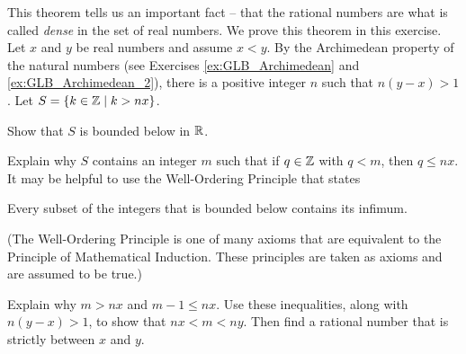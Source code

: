 This theorem tells us an important fact -- that the rational numbers are what is called \emph{dense} in the set of real numbers. We prove this theorem in this exercise. Let $x$ and $y$ be real numbers and assume $x < y$. By the Archimedean property of the natural numbers (see Exercises \ref{ex:GLB_Archimedean} and \ref{ex:GLB_Archimedean_2}), there is a positive integer $n$ such that $n(y-x) > 1$. Let $S = \{k \in \mathbb{Z} \mid k > nx \}$. 
\ba
\item Show that $S$ is bounded below in $\mathbb{R}$.

\item Explain why $S$ contains an integer $m$ such that if $q \in \mathbb{Z}$ with $q < m$, then $q \leq nx$.  It may be helpful to use the Well-Ordering Principle that states
\begin{center} Every subset of the integers that is bounded below contains its infimum. \end{center}
(The Well-Ordering Principle is one of many axioms that are equivalent to the Principle of Mathematical Induction. These principles are taken as axioms and are assumed to be true.)

\item Explain why $m > nx$ and $m-1 \leq nx$. Use these inequalities, along with $n(y-x) > 1$, to show that $nx < m < ny$. Then find a rational number that is strictly between $x$ and $y$.  

\ea


\begin{comment}

\ExerciseSolution

\ba
\item The real number $nx$ is a lower bound for $S$ in $\R$. That is, if $q \in \Z$ with $q < nx$, then $q \notin S$. 

\item We now know that $S$ is bounded below. To show that $S$ has an infimum, we need to show that $S$ is not empty. This is again by the Archimedean property of $\Z$ -- that $\Z$ is unbounded above. Since $S$ is a nonempty set that is bounded below, $S$ has an infimum $m$. The Well-Ordering Principle then shows that $m \in S$. 

\item Since $m \in S$, we have $m > nx$ by definition. The fact that $m-1 < m$ and that $m$ is the greatest lower bound of $S$ implies that $m-1 \notin S$. So $m-1 \leq nx$ and $m \leq nx + 1$. 
Recall that $n(y-x) > 1$, so $ny > nx+1$ and we have 
\[m \leq nx +1 < ny.\]
Combining the inequalities $nx < m$ and $m < ny$ gives us 
\[nx<m < ny.\]
Since $n > 0$, we can divide all parts of the last inequality to obtain
\[x < \frac{m}{n} < y,\]
and we have demonstrated the existence of a rational number strictly between $x$ and $y$. 

\ea

\end{comment}

